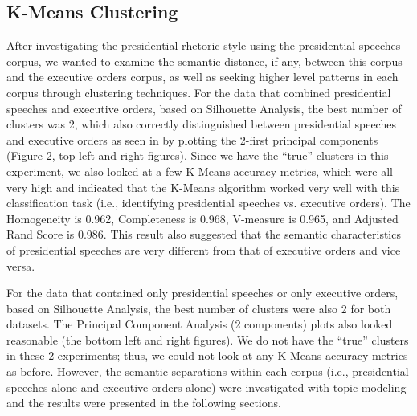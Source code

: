 \documentclass{article}
\begin{document}
{\subsection{K-Means Clustering}{After investigating the presidential rhetoric style using the presidential speeches corpus, we wanted to examine the semantic distance, if any, between this corpus and the executive orders corpus, as well as seeking higher level patterns in each corpus through clustering techniques. For the data that combined presidential speeches and executive orders, based on Silhouette Analysis, the best number of clusters was 2, which also correctly distinguished between presidential speeches and executive orders as seen in by plotting the 2-first principal components (Figure 2,  top left and right figures). Since we have the “true” clusters in this experiment, we also looked at a few K-Means accuracy metrics, which were all very high and indicated that the K-Means algorithm worked very well with this classification task (i.e., identifying presidential speeches vs. executive orders). The Homogeneity is 0.962, Completeness is 0.968, V-measure is 0.965, and Adjusted Rand Score is 0.986. This result also suggested that the semantic characteristics of presidential speeches are very different from that of executive orders and vice versa.

For the data that contained only presidential speeches or only executive orders, based on Silhouette Analysis, the best number of clusters were also 2 for both datasets. The Principal Component Analysis (2 components) plots also looked reasonable (the bottom left and right figures). We do not have the “true” clusters in these 2 experiments; thus, we could not look at any K-Means accuracy metrics as before. However, the semantic separations within each corpus (i.e., presidential speeches alone and executive orders alone) were investigated with topic modeling and the results were presented in the following sections.

}}
\end{document}
